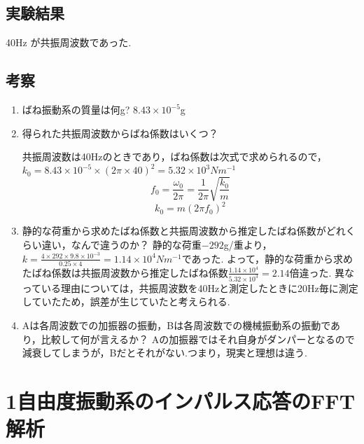 \documentclass[twocolumn, 10pt,a4j]{jsarticle}
\begin{document}
      \subsection{実験結果}
          40Hz が共振周波数であった.
      \subsection{考察}
        \begin{enumerate}
          \item ばね振動系の質量は何g?
            $8.43 \times 10^{-5}$g

          \item 得られた共振周波数からばね係数はいくつ？
            
            共振周波数は40Hzのときであり，ばね係数は次式で求められるので，$k_{0} = 8.43 \times 10^{-5} \times (2\pi\times40)^2 = 5.32 \times 10^3 Nm^{-1}$
            \begin{equation}
              f_{0} = \frac{\omega_{0}}{2\pi} = \frac{1}{2\pi}\sqrt{\frac{k_{0}}{m}}
            \end{equation}
            \begin{equation}
              k_{0} = m(2 \pi f_{0})^2
            \end{equation}
          \item 静的な荷重から求めたばね係数と共振周波数から推定したばね係数がどれくらい違い，なんで違うのか？
              静的な荷重$-292$g/重より，$k=\frac{4\times292\times9.8\times10^{-3}}{0.25\times4} = 1.14 \times 10^{4} Nm^{-1}$であった.
            よって，静的な荷重から求めたばね係数は共振周波数から推定したばね係数$\frac{1.14 \times 10^{4}}{5.32 \times 10^3} = 2.14$倍違った.
            異なっている理由については，共振周波数を40Hzと測定したときに20Hz毎に測定していたため，誤差が生じていたと考えられる.


          \item Aは各周波数での加振器の振動，Bは各周波数での機械振動系の振動であり，比較して何が言えるか？
            Aの加振器ではそれ自身がダンパーとなるので減衰してしまうが，Bだとそれがない.つまり，現実と理想は違う.
        \end{enumerate}

    \section{1自由度振動系のインパルス応答のFFT解析}
\end{document}
